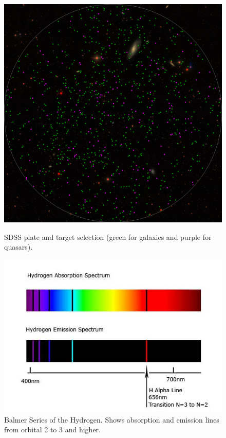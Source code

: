 \begin{figure}[H]
  \centering
  \begin{minipage}[b]{.4\textwidth}
    \includegraphics[width=\textwidth]{figures/plate}
    \caption{SDSS plate and target selection (green for galaxies and purple for quasars).}
    \label{fig:sdss_plate}
  \end{minipage}
  \hfill
  \begin{minipage}[b]{.45\textwidth}
    \includegraphics[width=\textwidth]{figures/hydrogen-spectra}
    \caption{Balmer Series of the Hydrogen. Shows absorption and emission lines from orbital 2 to 3 and higher.}
    \label{fig:balmer_series}
  \end{minipage}
\end{figure}

